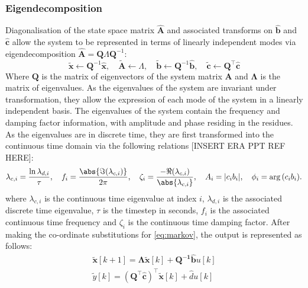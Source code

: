 \subsubsection{Eigendecomposition}
\label{sec:eigendecomposition}
Diagonalisation of the state space matrix $\hat{\mathbf{A}}$ and associated transforms on $\hat{\mathbf{b}}$ and $\hat{\mathbf{c}}$ allow the system to be represented in terms of linearly independent modes via eigendecomposition $\hat{\mathbf{A}} = \mathbf{Q} \Lambda \mathbf{Q}^{-1}$:
\begin{equation}
\label{eq:coord}
    \tilde{\mathbf{x}}       \leftarrow \mathbf{Q}^{-1}\mathbf{\hat{x}},
    \quad \tilde{\mathbf{A}} \leftarrow \Lambda,
    \quad \tilde{\mathbf{b}} \leftarrow \mathbf{Q}^{-1} \hat{\mathbf{b}},
    \quad \tilde{\mathbf{c}} \leftarrow \mathbf{Q}^{\top} \hat{\mathbf{c}}
\end{equation}
Where $\mathbf{Q}$ is the matrix of eigenvectors of the system matrix $\mathbf{A}$ and $\mathbf{\Lambda}$ is the matrix of eigenvalues. As the eigenvalues of the system are invariant under transformation, they allow the expression of each mode of the system in a linearly independent basis.
The eigenvalues of the system contain the frequency and damping factor information, with amplitude and phase residing in the residues. As the eigenvalues are in discrete time, they are first transformed into the continuous time domain via the following relations [INSERT ERA PPT REF HERE]:
\begin{equation}
\label{eq:era-parameters}
    \lambda_{c,i} = \frac{\ln \lambda_{d,i}}{\tau}, \quad 
    f_{i} = \frac{\abs{\Im(\lambda_{c,i})}}{2\pi}, \quad 
    \zeta_{i} = \frac{-\Re(\lambda_{c,i})}{\abs{\lambda_{c,i}}}, \quad
    A_{i} = |c_{i}b_{i}|, \quad
    \phi_{i} = \arg{(c_{i}b_{i})}.
\end{equation}
where $\lambda_{c,i}$ is the continuous time eigenvalue at index $i$, $\lambda_{d,i}$ is the associated discrete time eigenvalue, $\tau$ is the timestep in seconds, $f_{i}$ is the associated continuous time frequency and $\zeta_{i}$ is the continuous time damping factor.
After making the co-ordinate substitutions for \eqref{eq:markov}, the output is represented as follows:
\begin{align}
\label{eq:markov-eig}
    \mathbf{\tilde{x}}[k + 1] = \mathbf{\Lambda} \mathbf{ \tilde{x}}[k] + \mathbf{Q^{-1} \hat{b}}u[k]\\
    \tilde{y}[k] = \left( \mathbf{Q}^{\top} \hat{\mathbf{c}} \right)^{\top} \tilde{\mathbf{x}}[k] + \hat{d}u[k]
\end{align}
